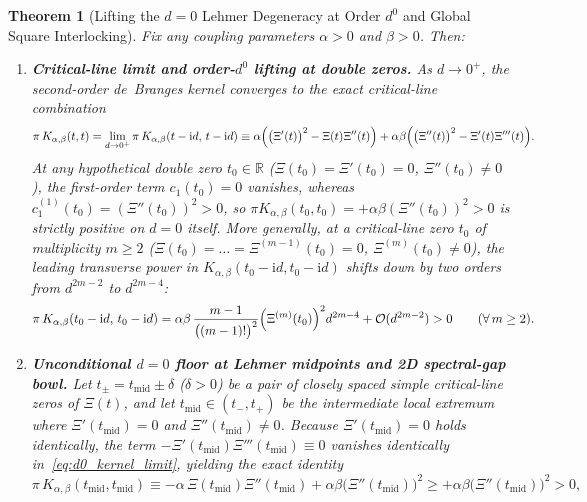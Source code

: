 \documentclass[11pt,reqno]{amsart}
\newtheorem{theorem}{Theorem}[section]
\theoremstyle{definition}
\theoremstyle{remark}
\numberwithin{equation}{section}
\newcommand{\R}{\mathbb{R}}
\newcommand{\ii}{\mathrm{i}}
\newcommand{\fac}{\mathclose{\mathchar"0021}}
\begin{document}
\begin{theorem}[Lifting the $d=0$ Lehmer Degeneracy at Order $d^0$ and Global Square Interlocking]\label{thm:lehmer_lifting}
Fix any coupling parameters $\alpha > 0$ and $\beta > 0$. Then:
\begin{enumerate}[label=\textup{(\roman*)},leftmargin=2.2em]
\item \textbf{Critical-line limit and order-$d^0$ lifting at double zeros.} As $d \to 0^+$, the second-order de~Branges kernel converges to the exact critical-line combination
\begin{equation}\label{eq:d0_kernel_limit}
\pi\,K_{\alpha,\beta}(t,t) = \lim_{d \to 0^+} \pi\,K_{\alpha,\beta}(t - \ii d,\, t - \ii d) \equiv \alpha\Bigl(\bigl(\Xi'(t)\bigr)^2 - \Xi(t)\Xi''(t)\Bigr) + \alpha\beta\Bigl(\bigl(\Xi''(t)\bigr)^2 - \Xi'(t)\Xi'''(t)\Bigr).
\end{equation}
At any hypothetical double zero $t_0 \in \R$ ($\Xi(t_0) = \Xi'(t_0) = 0$, $\Xi''(t_0) \neq 0$), the first-order term $c_1(t_0) = 0$ vanishes, whereas $c_1^{(1)}(t_0) = (\Xi''(t_0))^2 > 0$, so $\pi K_{\alpha,\beta}(t_0, t_0) = +\alpha\beta(\Xi''(t_0))^2 > 0$ is strictly positive on $d = 0$ itself. More generally, at a critical-line zero $t_0$ of multiplicity $m \ge 2$ ($\Xi(t_0) = \dots = \Xi^{(m-1)}(t_0) = 0$, $\Xi^{(m)}(t_0) \neq 0$), the leading transverse power in $K_{\alpha,\beta}(t_0-\ii d, t_0-\ii d)$ shifts down by two orders from $d^{2m-2}$ to $d^{2m-4}$:
\begin{equation}\label{eq:mult_m_shift_down}
\pi\,K_{\alpha,\beta}(t_0 - \ii d,\, t_0 - \ii d) = \alpha\beta\,\frac{m-1}{\bigl((m-1)\fac\bigr)^2}\Bigl(\Xi^{(m)}(t_0)\Bigr)^2 d^{2m-4} + \mathcal{O}(d^{2m-2}) > 0 \qquad (\forall\, m \ge 2).
\end{equation}
\item \textbf{Unconditional $d=0$ floor at Lehmer midpoints and 2D spectral-gap bowl.} Let $t_\pm = t_{\mathrm{mid}} \pm \delta$ ($\delta > 0$) be a pair of closely spaced simple critical-line zeros of $\Xi(t)$, and let $t_{\mathrm{mid}} \in (t_-, t_+)$ be the intermediate local extremum where $\Xi'(t_{\mathrm{mid}}) = 0$ and $\Xi''(t_{\mathrm{mid}}) \neq 0$. Because $\Xi'(t_{\mathrm{mid}}) = 0$ holds identically, the term $-\Xi'(t_{\mathrm{mid}})\Xi'''(t_{\mathrm{mid}}) \equiv 0$ vanishes identically in~\eqref{eq:d0_kernel_limit}, yielding the exact identity
\begin{equation}\label{eq:lehmer_midpoint_exact}
\pi\,K_{\alpha,\beta}(t_{\mathrm{mid}}, t_{\mathrm{mid}}) \equiv -\alpha\,\Xi(t_{\mathrm{mid}})\Xi''(t_{\mathrm{mid}}) + \alpha\beta\bigl(\Xi''(t_{\mathrm{mid}})\bigr)^2 \ge +\alpha\beta\bigl(\Xi''(t_{\mathrm{mid}})\bigr)^2 > 0,

\end{equation}
\end{enumerate}
\end{theorem}
\end{document}
